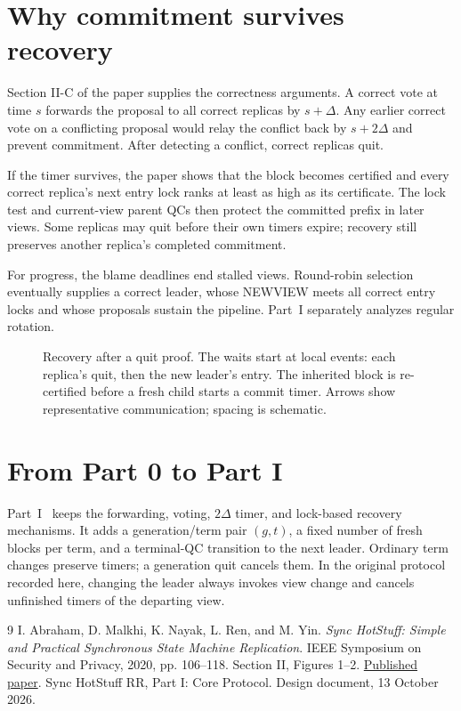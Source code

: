 \documentclass[11pt,a4paper]{article}
\newcounter{protocol}
\begin{document}
\section{Why commitment survives recovery}
\label{sec:safety}
Section II-C of the paper supplies the correctness arguments. A correct
vote at time $s$ forwards the proposal to all correct replicas by
$s+\Delta$. Any earlier correct vote on a conflicting proposal would
relay the conflict back by $s+2\Delta$ and prevent commitment.
After detecting a conflict, correct replicas quit.

If the timer survives, the paper shows that the block becomes certified
and every correct replica's next entry lock ranks at least as high as
its certificate. The lock test and current-view parent QCs then protect
the committed prefix in later views. Some replicas may quit before
their own timers expire; recovery still preserves another replica's
completed commitment.

For progress, the blame deadlines end stalled views. Round-robin
selection eventually supplies a correct leader, whose NEWVIEW meets
all correct entry locks and whose proposals sustain the pipeline.
Part~I separately analyzes regular rotation.

\begin{figure}[H]\centering

\caption{Recovery after a quit proof. The waits start at local events:
each replica's quit, then the new leader's entry. The inherited block
is re-certified before a fresh child starts a commit timer. Arrows
show representative communication; spacing is schematic.}
\label{fig:change}
\end{figure}

\section{From Part 0 to Part I}
\label{sec:rr}
Part~I~\cite{part1} keeps the forwarding, voting, $2\Delta$ timer,
and lock-based recovery mechanisms. It adds a generation/term pair
$(g,t)$, a fixed number of fresh blocks per term, and a terminal-QC
transition to the next leader. Ordinary term changes preserve timers;
a generation quit cancels them. In the original protocol recorded
here, changing the leader always invokes view change and cancels
unfinished timers of the departing view.

\begin{thebibliography}{9}
I. Abraham, D. Malkhi, K. Nayak, L. Ren, and M. Yin.
\emph{Sync HotStuff: Simple and Practical Synchronous State Machine Replication}.
IEEE Symposium on Security and Privacy, 2020, pp. 106--118.
Section II, Figures 1--2.
\href{https://conferences.computer.org/sp/pdfs/sp/2020/349700a106.pdf}{Published paper}.
Sync HotStuff RR, Part I: Core Protocol. Design document, 13 October 2026.
\end{thebibliography}
\end{document}
